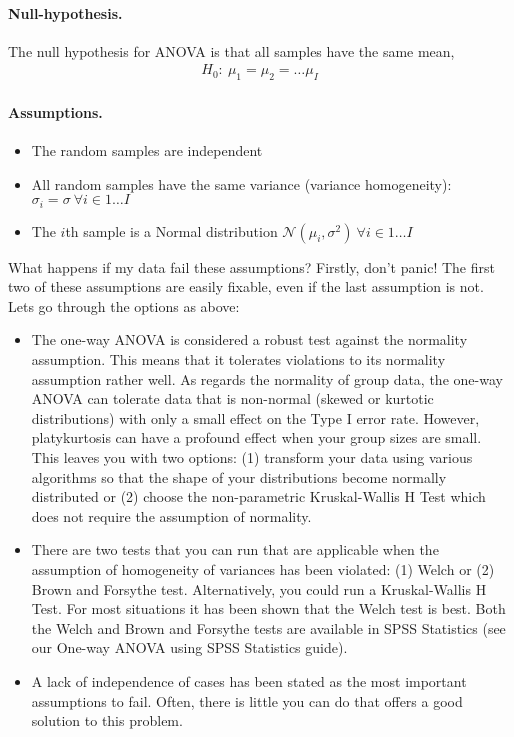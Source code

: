 \documentclass[10pt,a4paper]{article}
\begin{document}
\paragraph{Null-hypothesis.} The null hypothesis for ANOVA is that all samples have the same mean,
\begin{align}
H_0: ~ \mu_1=\mu_2=\dots\mu_I
\end{align}
\paragraph{Assumptions.}
\begin{itemize}
\item The random samples are independent
\item All random samples have the same variance (variance homogeneity): $\sigma_i=\sigma ~ \forall i \in 1 \dots I$  
\item The $i$th sample is a Normal distribution $\mathcal N(\mu_i, \sigma^2) ~ \forall i \in 1\dots I$
\end{itemize}

 
What happens if my data fail these assumptions?
Firstly, don't panic! The first two of these assumptions are easily fixable, even if the last assumption is not. Lets go through the options as above:
\begin{itemize}
\item
The one-way ANOVA is considered a robust test against the normality assumption. This means that it tolerates violations to its normality assumption rather well. As regards the normality of group data, the one-way ANOVA can tolerate data that is non-normal (skewed or kurtotic distributions) with only a small effect on the Type I error rate. However, platykurtosis can have a profound effect when your group sizes are small. This leaves you with two options: (1) transform your data using various algorithms so that the shape of your distributions become normally distributed or (2) choose the non-parametric Kruskal-Wallis H Test which does not require the assumption of normality.
\item
There are two tests that you can run that are applicable when the assumption of homogeneity of variances has been violated: (1) Welch or (2) Brown and Forsythe test. Alternatively, you could run a Kruskal-Wallis H Test. For most situations it has been shown that the Welch test is best. Both the Welch and Brown and Forsythe tests are available in SPSS Statistics (see our One-way ANOVA using SPSS Statistics guide).
\item
A lack of independence of cases has been stated as the most important assumptions to fail. Often, there is little you can do that offers a good solution to this problem. 
 \end{itemize}
 
\end{document}
